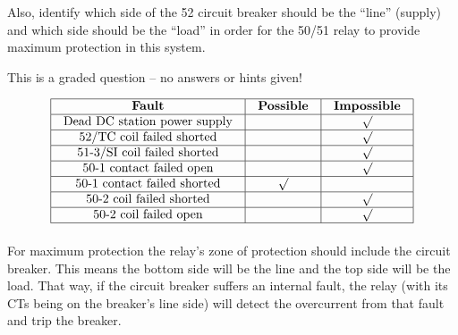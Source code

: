 Also, identify which side of the 52 circuit breaker should be the ``line'' (supply) and which side should be the ``load'' in order for the 50/51 relay to provide maximum protection in this system.

\vfil 

\eject






This is a graded question -- no answers or hints given!
 







$$\vbox{\offinterlineskip
\halign{\strut
\vrule \quad\hfil # \ \hfil & 
\vrule \quad\hfil # \ \hfil & 
\vrule \quad\hfil # \ \hfil \vrule \cr
\noalign{\hrule}
%
{\bf Fault} & {\bf Possible} & {\bf Impossible} \cr
%
\noalign{\hrule}
%
Dead DC station power supply &  & $\surd$ \cr
%
\noalign{\hrule}
%
52/TC coil failed shorted &  & $\surd$ \cr
%
\noalign{\hrule}
%
51-3/SI coil failed shorted &  & $\surd$ \cr
%
\noalign{\hrule}
%
50-1 contact failed open &  & $\surd$ \cr
%
\noalign{\hrule}
%
50-1 contact failed shorted & $\surd$ &  \cr
%
\noalign{\hrule}
%
50-2 coil failed shorted &  & $\surd$ \cr
%
\noalign{\hrule}
%
50-2 coil failed open &  & $\surd$ \cr
%
\noalign{\hrule}
} %
}$$ %

For maximum protection the relay's zone of protection should include the circuit breaker.  This means the bottom side will be the line and the top side will be the load.  That way, if the circuit breaker suffers an internal fault, the relay (with its CTs being on the breaker's line side) will detect the overcurrent from that fault and trip the breaker.




